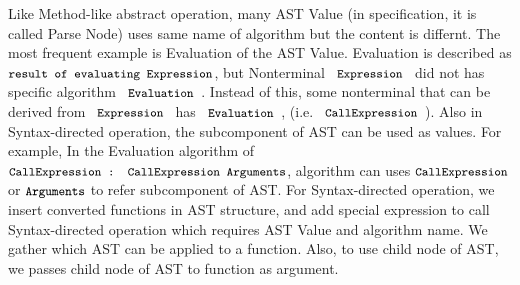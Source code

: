  Like Method-like abstract operation, many AST Value (in specification, it is called Parse Node) uses same name of algorithm but the content is differnt.
The most frequent example is Evaluation of the AST Value. Evaluation is described as \( \texttt{\small result of evaluating Expression} \), but Nonterminal
\( \code{ Expression } \) did not has specific algorithm \( \code{ Evaluation } \). Instead of this, some nonterminal that can be derived from \( \code{ Expression } \) has \( \code{ Evaluation }\),
(i.e. \( \code{ CallExpression } \)). Also in Syntax-directed operation, the subcomponent of AST can be used as values. For example, In the
Evaluation algorithm of\\ \( \texttt{\small CallExpression : CallExpression Arguments} \), algorithm can uses \( \code{CallExpression}\) or \( \texttt{\small Arguments}\) to refer subcomponent of AST.
 For Syntax-directed operation, we insert converted functions in AST structure, and add special expression to call Syntax-directed operation which requires AST Value and algorithm name.
We gather which AST can be applied to a function. Also, to use child node of AST, we passes child node of AST to function as argument.

% 
%     

% 
